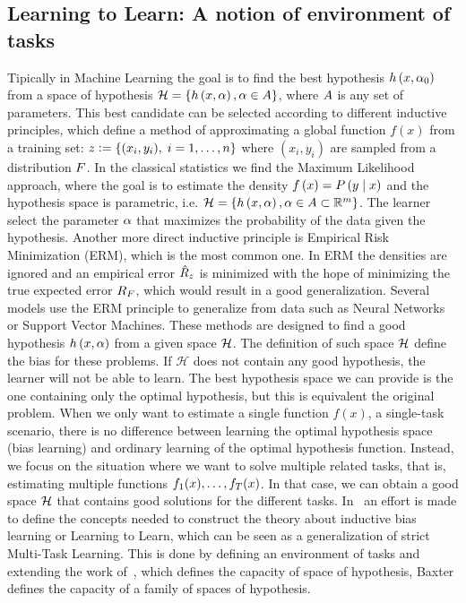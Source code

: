 \subsection{Learning to Learn: A notion of environment of tasks} %
Tipically in Machine Learning the goal is to find the best hypothesis $h\left(x, \alpha_0\right)$ from a space of hypothesis $\mathcal{H} = \left\{h\left(x, \alpha\right), \alpha \in A\right\}$, where $A$ is any set of parameters. This best candidate can be selected according to different inductive principles, which define a method of approximating a global function $f(x)$ from a training set:
$ z \vcentcolon= \left\{(x_i, y_i),\; i=1, \ldots, n\right\} $
where $(x_i, y_i)$ are sampled from a distribution $F$.
%
In the classical statistics we find the Maximum Likelihood approach, where the goal is to estimate the density $f\left(x\right) = P\left( y \;\middle\vert\; x \right)$ and the hypothesis space is parametric, i.e. $\mathcal{H} = \left\{h\left(x, \alpha\right), \alpha \in A \subset \mathbb{R}^m\right\}$. The learner select the parameter $\alpha$ that maximizes the probability of the data given the hypothesis.
%
Another more direct inductive principle is Empirical Risk Minimization (ERM), which is the most common one. In ERM the densities are ignored and an empirical error $\hat{R}_z$ is minimized with the hope of minimizing the true expected error $R_F$, which would result in a good generalization. 
%
Several models use the ERM principle to generalize from data such as Neural Networks or Support Vector Machines. These methods are designed to find a good hypothesis $h\left(x, \alpha\right)$ from a given space $\mathcal{H}$. The definition of such space $\mathcal{H}$ define the bias for these problems. If $\mathcal{H}$ does not contain any good hypothesis, the learner will not be able to learn.
The best hypothesis space we can provide is the one containing only the optimal hypothesis, but this is equivalent the original problem. When we only want to estimate a single function $f(x)$, a single-task scenario, there is no difference between learning the optimal hypothesis space (bias learning) and ordinary learning of the optimal hypothesis function.
Instead, we focus on the situation where we want to solve multiple related tasks, that is, estimating multiple functions $f_1(x), \ldots, f_T(x)$. In that case, we can obtain a good space $\mathcal{H}$ that contains good solutions for the different tasks.
%
In~\cite{baxter2000model} an effort is made to define the concepts needed to construct the theory about inductive bias learning or Learning to Learn, which can be seen as a generalization of strict Multi-Task Learning. This is done by defining an environment of tasks and extending the work of~\cite{vapnik2013nature}, which defines the capacity of space of hypothesis, Baxter defines the capacity of a family of spaces of hypothesis.

